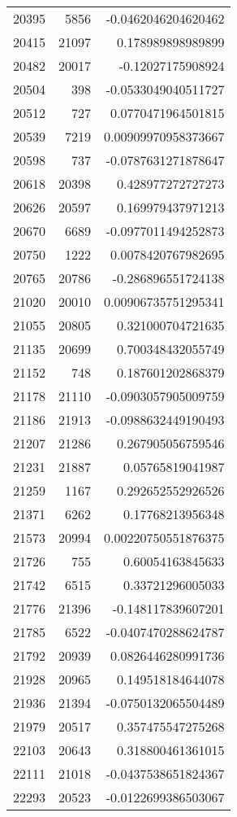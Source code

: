 \begin{tabular}{r | r | r}
20395 & 5856 & -0.0462046204620462 \\
20415 & 21097 & 0.178989898989899 \\
20482 & 20017 & -0.12027175908924 \\
20504 & 398 & -0.0533049040511727 \\
20512 & 727 & 0.0770471964501815 \\
20539 & 7219 & 0.00909970958373667 \\
20598 & 737 & -0.0787631271878647 \\
20618 & 20398 & 0.428977272727273 \\
20626 & 20597 & 0.169979437971213 \\
20670 & 6689 & -0.0977011494252873 \\
20750 & 1222 & 0.0078420767982695 \\
20765 & 20786 & -0.286896551724138 \\
21020 & 20010 & 0.00906735751295341 \\
21055 & 20805 & 0.321000704721635 \\
21135 & 20699 & 0.700348432055749 \\
21152 & 748 & 0.187601202868379 \\
21178 & 21110 & -0.0903057905009759 \\
21186 & 21913 & -0.0988632449190493 \\
21207 & 21286 & 0.267905056759546 \\
21231 & 21887 & 0.05765819041987 \\
21259 & 1167 & 0.292652552926526 \\
21371 & 6262 & 0.17768213956348 \\
21573 & 20994 & 0.00220750551876375 \\
21726 & 755 & 0.60054163845633 \\
21742 & 6515 & 0.33721296005033 \\
21776 & 21396 & -0.148117839607201 \\
21785 & 6522 & -0.0407470288624787 \\
21792 & 20939 & 0.0826446280991736 \\
21928 & 20965 & 0.149518184644078 \\
21936 & 21394 & -0.0750132065504489 \\
21979 & 20517 & 0.357475547275268 \\
22103 & 20643 & 0.318800461361015 \\
22111 & 21018 & -0.0437538651824367 \\
22293 & 20523 & -0.0122699386503067 \\

\end{tabular}
